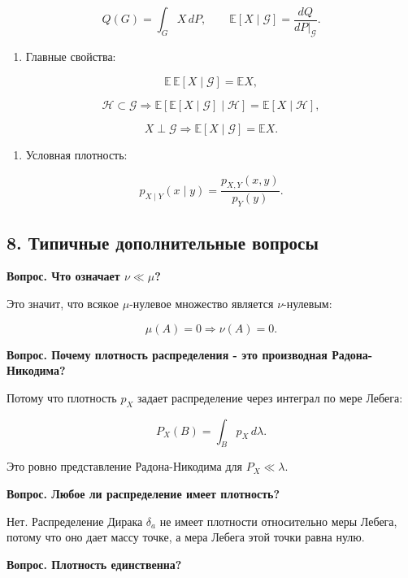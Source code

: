 \documentclass[
  11pt,
  a4paper,
]{article}
\providecommand{\tightlist}{%
  \setlength{\itemsep}{0pt}\setlength{\parskip}{0pt}}
\begin{document}
\[
Q(G)=\int_GX\,dP,
\qquad
\mathbb E[X\mid\mathcal G]=\frac{dQ}{dP|_{\mathcal G}}.
\]

\begin{enumerate}
\def\labelenumi{\arabic{enumi}.}
\setcounter{enumi}{5}
\tightlist
\item
  Главные свойства:
\end{enumerate}

\[
\mathbb E\,\mathbb E[X\mid\mathcal G]=\mathbb EX,
\]

\[
\mathcal H\subset\mathcal G
\Rightarrow
\mathbb E[\mathbb E[X\mid\mathcal G]\mid\mathcal H]
=
\mathbb E[X\mid\mathcal H],
\]

\[
X\perp\mathcal G
\Rightarrow
\mathbb E[X\mid\mathcal G]=\mathbb EX.
\]

\begin{enumerate}
\def\labelenumi{\arabic{enumi}.}
\setcounter{enumi}{6}
\tightlist
\item
  Условная плотность:
\end{enumerate}

\[
p_{X\mid Y}(x\mid y)=\frac{p_{X,Y}(x,y)}{p_Y(y)}.
\]

\subsection{8. Типичные дополнительные
вопросы}\label{ux442ux438ux43fux438ux447ux43dux44bux435-ux434ux43eux43fux43eux43bux43dux438ux442ux435ux43bux44cux43dux44bux435-ux432ux43eux43fux440ux43eux441ux44b}

\textbf{Вопрос. Что означает \(\nu\ll\mu\)?}

Это значит, что всякое \(\mu\)-нулевое множество является
\(\nu\)-нулевым:

\[
\mu(A)=0\Rightarrow\nu(A)=0.
\]

\textbf{Вопрос. Почему плотность распределения - это производная
Радона-Никодима?}

Потому что плотность \(p_X\) задает распределение через интеграл по мере
Лебега:

\[
P_X(B)=\int_Bp_X\,d\lambda.
\]

Это ровно представление Радона-Никодима для \(P_X\ll\lambda\).

\textbf{Вопрос. Любое ли распределение имеет плотность?}

Нет. Распределение Дирака \(\delta_a\) не имеет плотности относительно
меры Лебега, потому что оно дает массу точке, а мера Лебега этой точки
равна нулю.

\textbf{Вопрос. Плотность единственна?}
\end{document}
